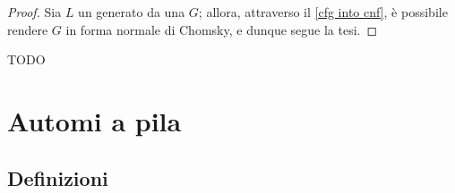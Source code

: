 \documentclass[a4paper, 12pt]{report}
\begin{document}
    \begin{proof}
        Sia $L$ un \CFL generato da una \CFG $G$; allora, attraverso il \cref{cfg into cnf}, è possibile rendere $G$ in forma normale di Chomsky, e dunque segue la tesi.
    \end{proof}

    \begin{example}
        TODO
    \end{example}

    \section{Automi a pila}

    \subsection{Definizioni}
\end{document}
